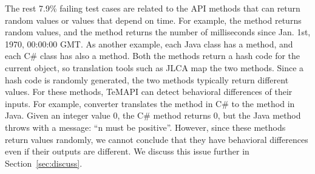 The rest 7.9\% failing test cases are related to the API methods that can return random values or values that depend on time. For example, the  method returns random values, and the  method returns the number of milliseconds since Jan. 1st, 1970, 00:00:00 GMT. As another example, each Java class has a  method, and each C\# class has also a  method. Both the methods return a hash code for the current object, so translation tools such as JLCA map the two methods. Since a hash code is randomly generated, the two methods typically return different values. For these methods, TeMAPI can detect behavioral differences of their inputs. For example, converter translates the  method in C\# to the  method in Java. Given an integer value 0, the C\# method returns 0, but the Java method throws  with a message: ``n must be positive''. However, since these methods return values randomly, we cannot conclude that they have behavioral differences even if their outputs are different. We discuss this issue further in Section~\ref{sec:discuss}.

